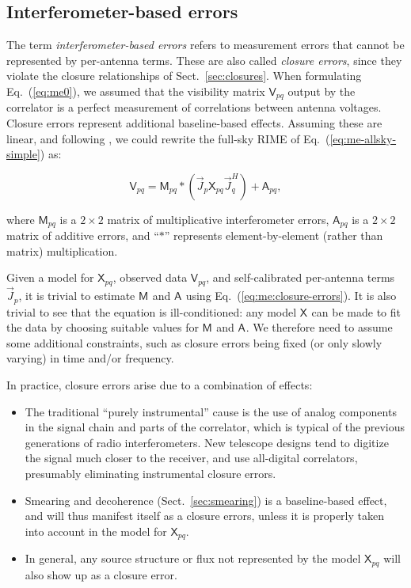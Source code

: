 \documentclass{aa}
\newcommand{\herm}{H}
\newcommand{\jones}[2]{\vec {#1}_{#2}}
\newcommand{\jonesT}[2]{\vec {#1}^{\herm}_{#2}}
\newcommand{\coh}[2]{\mathsf{{#1}}_{{#2}}}
\begin{document}
\subsection{\label{sec:closure-errors}Interferometer-based errors}

The term {\em interferometer-based errors} refers to measurement errors that cannot be represented by per-antenna terms.
These are also called {\em closure errors}, since they violate the closure relationships of Sect.~\ref{sec:closures}. When formulating Eq.~(\ref{eq:me0}), we assumed that the visibility matrix $\coh{V}{pq}$ output by the correlator is a perfect measurement of correlations between antenna voltages. Closure errors represent additional baseline-based effects. Assuming these are linear, and following \citet{JEN:note185}, we could rewrite the full-sky RIME of Eq.~(\ref{eq:me-allsky-simple}) as: 

    \begin{equation}\label{eq:me:closure-errors}
    \coh{V}{pq} = \coh{M}{pq} \ast ( \jones{J}{p} \coh{X}{pq}  \jonesT{J}{q} ) + \coh{A}{pq},
    \end{equation}

where $\coh{M}{pq}$ is a $2\times2$ matrix of multiplicative interferometer errors, $\coh{A}{pq}$ is a $2\times2$ matrix of additive errors, and ``$\ast$'' represents element-by-element (rather than matrix) multiplication.

Given a model for $\coh{X}{pq}$, observed data $\coh{V}{pq}$, and self-calibrated per-antenna terms $\jones{J}{p}$, it is trivial to estimate $\coh{M}{}$ and $\coh{A}{}$ using Eq.~(\ref{eq:me:closure-errors}). It is also trivial to see that the equation is ill-conditioned: any model $\coh{X}{}$ can be made to fit the data by choosing suitable values for $\coh{M}{}$ and $\coh{A}{}$. We therefore need to assume some additional constraints, such as closure errors being fixed (or only slowly varying) in time and/or frequency. 

In practice, closure errors arise due to a combination of effects:

\begin{itemize}
\item The traditional ``purely instrumental'' cause is the use of analog components in the signal chain and parts of the correlator, which is typical of the previous generations of radio interferometers. New telescope designs tend to digitize the signal much closer to the receiver, and use all-digital correlators, presumably eliminating instrumental closure errors. 
\item Smearing and decoherence (Sect.~\ref{sec:smearing}) is a baseline-based effect, and will thus manifest itself as a closure errors, unless it is properly taken into account in the model for $\coh{X}{pq}$.
\item In general, any source structure or flux not represented by the model $\coh{X}{pq}$ will also show up as a closure error.
\end{itemize}
\end{document}
